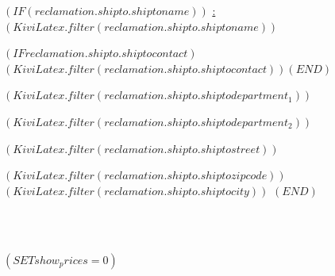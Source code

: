 $( IF (reclamation.shipto.shiptoname) )$%
  \vspace{0.8cm}
  \scriptsize \underline{\abweichendeLieferadresse:}\\
  \normalsize    $( KiviLatex.filter(reclamation.shipto.shiptoname) )$

                 $( IF reclamation.shipto.shiptocontact )$ $( KiviLatex.filter(reclamation.shipto.shiptocontact) )$$( END )$

                 $( KiviLatex.filter(reclamation.shipto.shiptodepartment_1) )$

                 $( KiviLatex.filter(reclamation.shipto.shiptodepartment_2) )$

                 $( KiviLatex.filter(reclamation.shipto.shiptostreet) )$

                 $( KiviLatex.filter(reclamation.shipto.shiptozipcode) )$ $( KiviLatex.filter(reclamation.shipto.shiptocity) )$
$( END )$
\vspace*{1.5cm}

\hfill

\\

\ekreklamationsformel\\

\vspace{0.5cm}

$( SET show_prices = 0 )$

